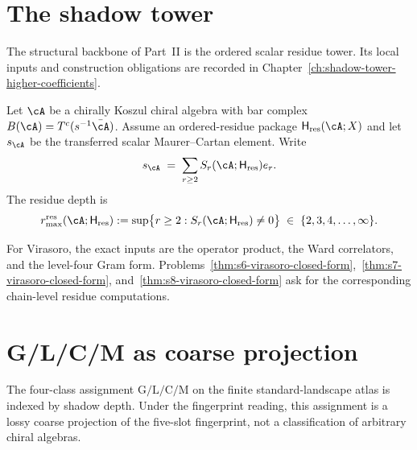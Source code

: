 \section{The shadow tower}
\label{sec:part-ii-shadow-tower}

The structural backbone of Part~II is the ordered scalar residue
tower.  Its local inputs and construction obligations are recorded in
Chapter~\ref{ch:shadow-tower-higher-coefficients}.

\begin{definitionref}
\label{def:part-ii-shadow-tower-recall}
Let $\cA$ be a chirally Koszul chiral algebra with bar complex
$B(\cA) = T^c(s^{-1}\bar\cA)$.  Assume an ordered-residue package
$\mathsf H_{\mathrm{res}}(\cA;X)$ and let
$s_\cA$ be the transferred scalar Maurer--Cartan element.  Write
\begin{equation}
 s_\cA \;=\; \sum_{r\ge2}
 S_r(\cA;\mathsf H_{\mathrm{res}})e_r.
\end{equation}
The residue depth is
\begin{equation}
 r_{\max}^{\mathrm{res}}(\cA;\mathsf H_{\mathrm{res}})
 :=\sup\bigl\{r\ge2:S_r(\cA;\mathsf H_{\mathrm{res}})\ne0\bigr\}
 \;\in\; \{2, 3, 4, \ldots, \infty\}.
\end{equation}
\end{definitionref}

For Virasoro, the exact inputs are the operator product, the Ward
correlators, and the level-four Gram form.
Problems~\ref{thm:s6-virasoro-closed-form},~\ref{thm:s7-virasoro-closed-form},
and~\ref{thm:s8-virasoro-closed-form} ask for the corresponding
chain-level residue computations.

\section{G/L/C/M as coarse projection}
\label{sec:part-ii-glcm}

The four-class assignment $\mathrm{G}/\mathrm{L}/\mathrm{C}/\mathrm{M}$
on the finite standard-landscape atlas is indexed by shadow depth.
Under the fingerprint reading, this assignment is a lossy coarse
projection of the five-slot fingerprint, not a classification of
arbitrary chiral algebras.

